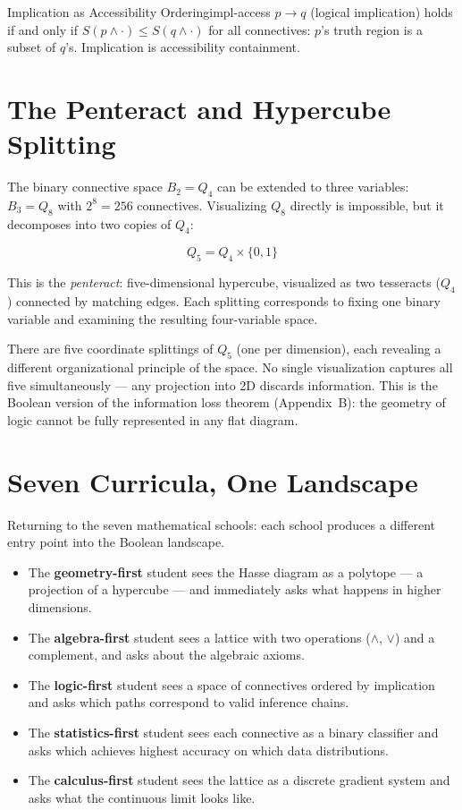 \begin{proposition}{Implication as Accessibility Ordering}{impl-access}
  $p \to q$ (logical implication) holds if and only if
  $S(p \wedge \cdot) \leq S(q \wedge \cdot)$ for all connectives:
  $p$'s truth region is a subset of $q$'s. Implication is
  accessibility containment.
\end{proposition}

\section{The Penteract and Hypercube Splitting}

The binary connective space $B_2 = Q_4$ can be extended to three
variables: $B_3 = Q_8$ with $2^8 = 256$ connectives. Visualizing $Q_8$
directly is impossible, but it decomposes into two copies of $Q_4$:

\[
  Q_5 = Q_4 \times \{0,1\}
\]

This is the \emph{penteract}: five-dimensional hypercube, visualized as
two tesseracts ($Q_4$) connected by matching edges. Each splitting
corresponds to fixing one binary variable and examining the resulting
four-variable space.

There are five coordinate splittings of $Q_5$ (one per dimension),
each revealing a different organizational principle of the space.
No single visualization captures all five simultaneously — any projection
into 2D discards information. This is the Boolean version of the
information loss theorem (Appendix~B): the geometry of logic cannot
be fully represented in any flat diagram.

\section{Seven Curricula, One Landscape}

Returning to the seven mathematical schools: each school produces a
different entry point into the Boolean landscape.

\begin{itemize}
  \item The \textbf{geometry-first} student sees the Hasse diagram as a
        polytope — a projection of a hypercube — and immediately asks
        what happens in higher dimensions.
  \item The \textbf{algebra-first} student sees a lattice with two
        operations ($\wedge$, $\vee$) and a complement, and asks about
        the algebraic axioms.
  \item The \textbf{logic-first} student sees a space of connectives
        ordered by implication and asks which paths correspond to
        valid inference chains.
  \item The \textbf{statistics-first} student sees each connective as
        a binary classifier and asks which achieves highest accuracy
        on which data distributions.
  \item The \textbf{calculus-first} student sees the lattice as a
        discrete gradient system and asks what the continuous limit looks like.
\end{itemize}


